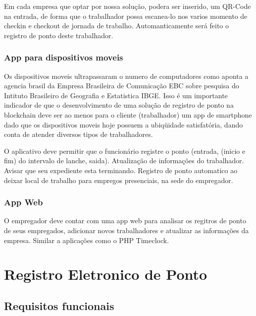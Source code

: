 \documentclass[12pt,openright,twoside,a4paper,english, brazil]{abntex2} %
\begin{document}
Em cada empresa que optar por nossa solução, podera ser inserido, um QR-Code na entrada, de forma que o trabalhador possa escanea-lo nos varios momento de checkin e checkout de jornada de trabalho. Automanticamente será feito o registro de ponto deste trabalhador.


\subsection{App para dispositivos moveis}

Os dispositivos moveis ultrapassaram o numero de computadores como aponta a agencia brasil da Empresa Brasileira de Comunicação \gls{EBC} sobre pesquisa do Intituto Brasileiro de Geografia e Estatistica \gls{IBGE}. Isso é um importante indicador de que o desenvolvimento de uma solução de registro de ponto na blockchain deve ser ao menos para o cliente (trabalhador) um app de smartphone dado que os dispositivos moveis hoje possuem a ubiqüidade satisfatória, dando conta de atender diversos tipos de trabalhadores.

O aplicativo deve permitir que o funcionário registre o ponto (entrada, (inicio e fim) do intervalo de lanche, saida). Atualização de informações do trabalhador. Avisar que seu expediente esta terminando. Registro de ponto automatico ao deixar local de trabalho para empregos presenciais, na sede do empregador. 

\subsection{App Web}

O empregador deve contar com uma app web para analisar os regitros de ponto de seus empregados, adicionar novos trabalhadores e atualizar as informações da empresa. Similar a aplicações como o PHP Timeclock.


\chapter{Registro Eletronico de Ponto}




\section{Requisitos funcionais}
\end{document}

